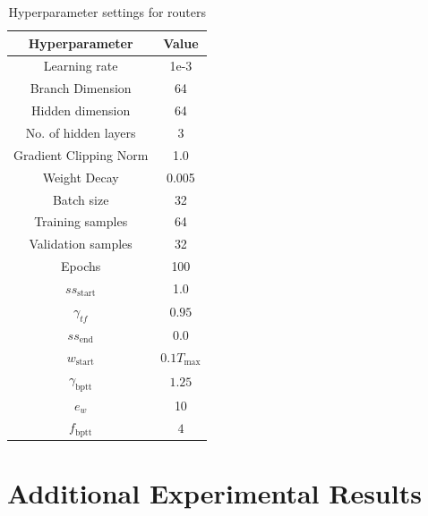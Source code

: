 \documentclass{article} %
\begin{document}
\begin{table}
    \centering
    \begin{tabular}{|c|c|}
        \hline
        Hyperparameter & Value\\
        \hline \hline
        Learning rate & 1e-3 \\
        Branch Dimension & 64 \\
        Hidden dimension & 64 \\
        No. of hidden layers & 3\\
        Gradient Clipping Norm & 1.0  \\
        Weight Decay & 0.005 \\
        Batch size & 32 \\
        Training samples & 64 \\
        Validation samples & 32 \\
        Epochs & 100 \\
        $ss_{\text{start}}$ & 1.0\\
        $\gamma_{tf}$ & $0.95$ \\
        $ss_{\text{end}}$ & 0.0 \\
        $w_{\text{start}}$ & $0.1T_{\max}$ \\
        $\gamma_{\text{bptt}}$ & $1.25$ \\
        $e_w$ & 10 \\
        $f_{\text{bptt}}$ & $4$ \\
        \hline
    \end{tabular}
    \caption{Hyperparameter settings for routers}
    \label{tab:routerhpsettings}
\end{table}



\section{Additional Experimental Results} \label{sec:moreexperimentalresults}
\end{document}
